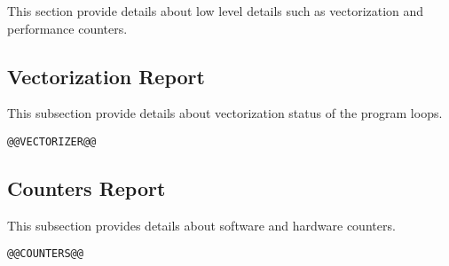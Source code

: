 \documentclass[a4paper]{article}
\begin{document}
This section provide details about low level details such as vectorization and performance counters.

\subsection{Vectorization Report}

This subsection provide details about vectorization status of the program loops.

\begin{verbatim}
@@VECTORIZER@@
\end{verbatim}

\subsection{Counters Report}

This subsection provides details about software and hardware counters.

\begin{verbatim}
@@COUNTERS@@
\end{verbatim}
\end{document}
